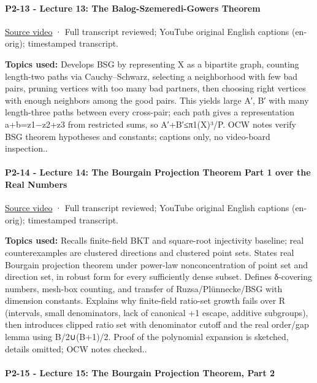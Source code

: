 \paragraph{P2-13 - Lecture 13: The Balog-Szemeredi-Gowers Theorem}\label{p2-13---lecture-13-the-balog-szemeredi-gowers-theorem}

\href{https://www.youtube.com/watch?v=DGBuM5pEdoo}{Source video} · Full transcript reviewed; YouTube original English captions (en-orig); timestamped transcript.

\textbf{Topics used:} Develops BSG by representing X as a bipartite graph, counting length-two paths via Cauchy--Schwarz, selecting a neighborhood with few bad pairs, pruning vertices with too many bad partners, then choosing right vertices with enough neighbors among the good pairs. This yields large A′, B′ with many length-three paths between every cross-pair; each path gives a representation a+b=z1−z2+z3 from restricted sums, so \textbar A′+B′\textbar≤\textbar π1(X)\textbar³/P. OCW notes verify BSG theorem hypotheses and constants; captions only, no video-board inspection..

\paragraph{P2-14 - Lecture 14: The Bourgain Projection Theorem Part 1 over the Real Numbers}\label{p2-14---lecture-14-the-bourgain-projection-theorem-part-1-over-the-real-numbers}

\href{https://www.youtube.com/watch?v=0UYCJ0cjG9k}{Source video} · Full transcript reviewed; YouTube original English captions (en-orig); timestamped transcript.

\textbf{Topics used:} Recalls finite-field BKT and square-root injectivity baseline; real counterexamples are clustered directions and clustered point sets. States real Bourgain projection theorem under power-law nonconcentration of point set and direction set, in robust form for every sufficiently dense subset. Defines δ-covering numbers, mesh-box counting, and transfer of Ruzsa/Plünnecke/BSG with dimension constants. Explains why finite-field ratio-set growth fails over R (intervals, small denominators, lack of canonical +1 escape, additive subgroups), then introduces clipped ratio set with denominator cutoff and the real order/gap lemma using B/2∪(B+1)/2. Proof of the polynomial expansion is sketched, details omitted; OCW notes checked..

\paragraph{P2-15 - Lecture 15: The Bourgain Projection Theorem, Part 2}\label{p2-15---lecture-15-the-bourgain-projection-theorem-part-2}

